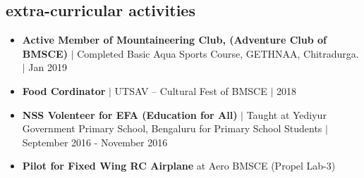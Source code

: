 \documentclass[margin,line]{res}
\begin{document}
\begin{resume}
		\section{\sc extra-curricular activities}

			\begin{itemize}
				\item \textbf{Active Member of Mountaineering Club, (Adventure Club of BMSCE)} $\vert$ Completed Basic Aqua Sports Course, GETHNAA, Chitradurga. $\vert$ Jan 2019
				\item \textbf{Food Cordinator} $\vert$ UTSAV -- Cultural Fest of BMSCE $\vert$ 2018
				\item \textbf{NSS Volenteer for EFA (Education for All)} $\vert$ Taught at Yediyur Government Primary School, Bengaluru for Primary School Students $\vert$ September 2016 - November 2016
					\item \textbf{Pilot for Fixed Wing RC Airplane} at Aero BMSCE (Propel Lab-3)
			\end{itemize} 



\end{resume}
\end{document}
